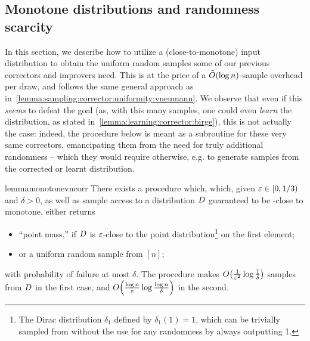 \subsection{Monotone distributions and randomness scarcity}\label{sec:monotonicity:extract}
		In this section, we describe how to utilize a (close-to-monotone) input distribution to obtain the uniform random samples some of our previous correctors and improvers need. This is at the price of a $\tildeO{\log n}$-sample overhead per draw, and follows the same general approach as in~\autoref{lemma:sampling:corrector:uniformity:vneumann}. We observe that even if this \emph{seems} to defeat the goal (as, with this many samples, one could even \emph{learn} the distribution, as stated in~\autoref{lemma:learning:corrector:birge}), this is not actually the case: indeed, the procedure below is meant as a subroutine for these very same correctors, emancipating them from the need for truly additional randomness -- which they would require otherwise, e.g. to generate samples from the corrected or learnt distribution.
\begin{restatable}{lemma}{monotonevncorr}\label{lemma:randomness:monotone:vneumann}
  There exists a procedure which, which, given $\varepsilon\in[0,1/3)$ and $\delta > 0$, as well as sample access to a distribution $D$ guaranteed to be \eps-close to monotone, either returns
  \begin{itemize}
    \item \textsf{``point mass,''} if $D$ is $\varepsilon$-close to the point distribution\footnote{The Dirac distribution $\delta_1$ defined by $\delta_1(1)=1$, which can be trivially sampled from without the use for any randomness by always outputting 1.}  on the first element;
    \item or a uniform random sample from $[n]$;
  \end{itemize}
   with probability of failure at most $\delta$. The procedure makes $\bigO{\frac{1}{\eps^2} \log\frac{1}{\delta}}$ samples from $D$ in the first case, and $\bigO{\frac{\log n}{\eps} \log\frac{\log n}{\delta}}$ in the second.
\end{restatable}
